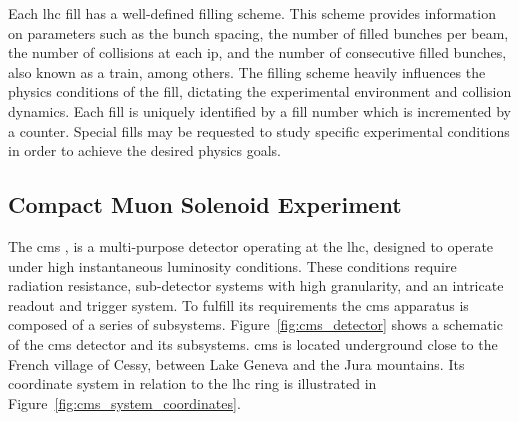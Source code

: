 Each \acrshort{lhc} fill has a well-defined filling scheme. This scheme provides information on parameters such as the bunch spacing, the number of filled bunches per beam, the number of collisions at each \acrshort{ip}, and the number of consecutive filled bunches, also known as a train, among others. The filling scheme heavily influences the physics conditions of the fill, dictating the experimental environment and collision dynamics. Each fill is uniquely identified by a fill number which is incremented by a counter. Special fills may be requested to study specific experimental conditions in order to achieve the desired physics goals.


\subsection{Compact Muon Solenoid Experiment}
\label{subsec:cms}

The \acrlong{cms} \cite{TheCMSCollaboration_2008}, is a multi-purpose detector operating at the \acrshort{lhc}, designed to operate under high instantaneous luminosity conditions. These conditions require radiation resistance, sub-detector systems with high granularity, and an intricate readout and trigger system. To fulfill its requirements the \acrshort{cms} apparatus is composed of a series of subsystems. Figure~\ref{fig:cms_detector} shows a schematic of the \acrshort{cms} detector and its subsystems. \acrshort{cms} is located underground close to the French village of Cessy, between Lake Geneva and the Jura mountains. Its coordinate system in relation to the \acrshort{lhc} ring is illustrated in Figure~\ref{fig:cms_system_coordinates}.

